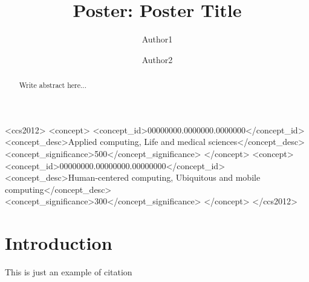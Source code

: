 \documentclass[sigconf,11pt]{acmart}
\begin{document}
\title{Poster: Poster Title}

\author{Author1}

\author{Author2}





\begin{abstract}
  Write abstract here...
\end{abstract}
\begin{CCSXML}
<ccs2012>
 <concept>
  <concept_id>00000000.0000000.0000000</concept_id>
  <concept_desc>Applied computing, Life and medical sciences</concept_desc>
  <concept_significance>500</concept_significance>
 </concept>
 <concept>
  <concept_id>00000000.00000000.00000000</concept_id>
  <concept_desc>Human-centered computing, Ubiquitous and mobile computing</concept_desc>
  <concept_significance>300</concept_significance>
 </concept>
</ccs2012>
\end{CCSXML}


  
\maketitle

\section{Introduction}
  
This is just an example of citation~\cite{Knuth97}


\end{document}
